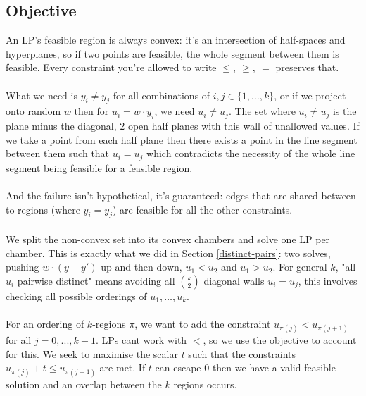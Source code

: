 \documentclass{article}
\begin{document}
\subsection*{Objective}
An LP's feasible region is always convex: it's an intersection of half-spaces and hyperplanes, so if two points are feasible, the whole segment between them is feasible. Every constraint you're allowed to write $\le,\ \ge,\  =$ preserves that.\\
\\
What we need is $y_i\neq y_j$ for all combinations of $i,j\in\{1,\dots,k\}$, or if we project onto random $w$ then for $u_i=w\cdot y_i$, we need $u_i\neq u_j$. The set where $u_i\neq u_j$ is the plane minus the diagonal, 2 open half planes with this wall of unallowed values. If we take a point from each half plane then there exists a point in the line segment between them such that $u_i=u_j$ which contradicts the necessity of the whole line segment being feasible for a feasible region.\\
\\
And the failure isn't hypothetical, it's guaranteed: edges that are shared between to regions (where $y_i = y_j$) are feasible for all the other constraints.\\
\\
We split the non-convex set into its convex chambers and solve one LP per chamber. This is exactly what we did in Section \ref{distinct-pairs}: two solves, pushing $w\cdot(y-y')$ up and then down, $u_1 < u_2$ and $u_1 > u_2$. For general $k$, "all $u_i$ pairwise distinct" means avoiding all $\binom{k}{2}$ diagonal walls $u_i = u_j$, this involves checking all possible orderings of $u_1,\dots, u_k$.\\
\\
For an ordering of $k$-regions $\pi$, we want to add the constraint $u_{\pi(j)}<u_{\pi(j+1)}$ for all $j=0,...,k-1$. LPs cant work with $<$, so we use the objective to account for this. We seek to maximise the scalar $t$ such that the constraints $u_{\pi(j)}+t\le u_{\pi(j+1)}$ are met. If $t$ can escape 0 then we have a valid feasible solution and an overlap between the $k$ regions occurs.
\end{document}
